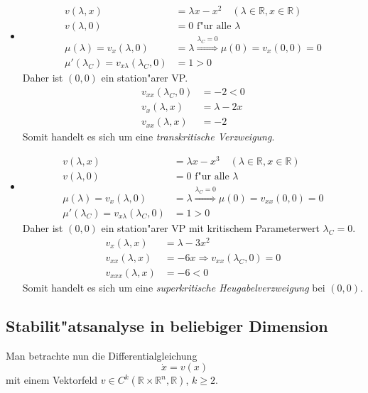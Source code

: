 \documentclass[a4paper, 13pt]{scrreprt}
\theoremstyle{definition} \newtheorem{definition}{Definition}[section]
\newenvironment{beispiel}[1][Beispiel]{\begin{trivlist}
\item[\hskip \labelsep {\bfseries #1}]}{\end{trivlist}}
\newcommand{\RR}{\mathbb{R}}
\begin{document}
\begin{beispiel}
\begin{itemize}
\item
\begin{align*}
v(\lambda,x) &= \lambda x-x^2\quad(\lambda\in\RR,x\in\RR)\\
v(\lambda,0) &= 0\text{ f"ur alle }\lambda\\
\mu(\lambda) = v_x(\lambda,0) &= \lambda \stackrel{\lambda_C = 0}{\Rightarrow}\mu(0) = v_{x}(0,0) = 0\\
\mu'(\lambda_C) = v_{x\lambda}(\lambda_C,0) &=1 > 0
\end{align*}
Daher ist $(0,0)$ ein station"arer VP.
\begin{align*}
v_{xx}(\lambda_C,0) &= -2 < 0\\
v_x(\lambda,x) &= \lambda-2x\\
v_{xx}(\lambda,x) &= -2
\end{align*}
Somit handelt es sich um eine \emph{transkritische Verzweigung}.

\item
\begin{align*}
v(\lambda,x) &= \lambda x-x^3\quad(\lambda\in\RR,x\in\RR)\\
v(\lambda,0) &= 0\text{ f"ur alle }\lambda\\
\mu(\lambda) = v_x(\lambda,0) &= \lambda \stackrel{\lambda_C = 0}{\Rightarrow}\mu(0) = v_{xx}(0,0) = 0\\
\mu'(\lambda_C) = v_{x\lambda}(\lambda_C,0) &=1 > 0
\end{align*}
Daher ist $(0,0)$ ein station"arer VP mit kritischem Parameterwert $\lambda_C = 0$.
\begin{align*}
v_x(\lambda,x) &= \lambda - 3x^2\\
v_{xx}(\lambda,x) &= -6x\Rightarrow v_{xx}(\lambda_C,0) = 0\\
v_{xxx}(\lambda,x) &= -6 < 0
\end{align*}
Somit handelt es sich um eine \emph{superkritische Heugabelverzweigung} bei $(0,0)$.
\end{itemize}
\end{beispiel}

\subsection{Stabilit"atsanalyse in beliebiger Dimension}
Man betrachte nun die Differentialgleichung 
$$\dot x = v(x)$$
mit einem Vektorfeld $v\in C^k(\RR \times \RR^n, \RR)$, $k\geq 2$.
\end{document}
